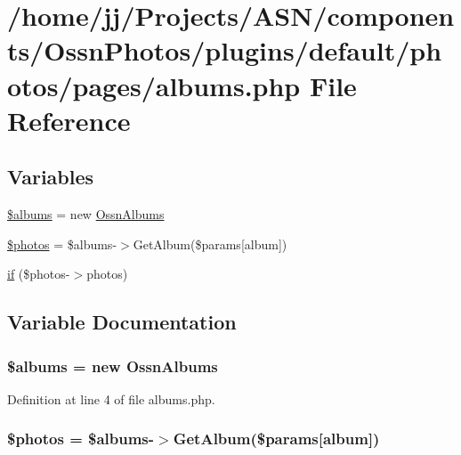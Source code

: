 \hypertarget{pages_2albums_8php}{}\section{/home/jj/\+Projects/\+A\+S\+N/components/\+Ossn\+Photos/plugins/default/photos/pages/albums.php File Reference}
\label{pages_2albums_8php}
\subsection*{Variables}
\begin{DoxyCompactItemize}
\item 
\hyperlink{pages_2albums_8php_a23e8244caaacd14d608137a383e8f0e7}{\$albums} = new \hyperlink{class_ossn_albums}{Ossn\+Albums}
\item 
\hyperlink{pages_2albums_8php_a7d16539c7a3688bee1d3184c81c47487}{\$photos} = \$albums-\/$>$Get\+Album(\$params\mbox{[}\textquotesingle{}album\textquotesingle{}\mbox{]})
\item 
\hyperlink{pages_2albums_8php_a5aed7d5753c8d4e84a25f746413591b9}{if} (\$photos-\/$>$photos)
\end{DoxyCompactItemize}


\subsection{Variable Documentation}
\subsubsection[{\texorpdfstring{\$albums}{$albums}}]{\setlength{\rightskip}{0pt plus 5cm}\$albums = new {\bf Ossn\+Albums}}\hypertarget{pages_2albums_8php_a23e8244caaacd14d608137a383e8f0e7}{}\label{pages_2albums_8php_a23e8244caaacd14d608137a383e8f0e7}


Definition at line 4 of file albums.\+php.

\subsubsection[{\texorpdfstring{\$photos}{$photos}}]{\setlength{\rightskip}{0pt plus 5cm}\$photos = \$albums-\/$>$Get\+Album(\$params\mbox{[}\textquotesingle{}album\textquotesingle{}\mbox{]})}\hypertarget{pages_2albums_8php_a7d16539c7a3688bee1d3184c81c47487}{}\label{pages_2albums_8php_a7d16539c7a3688bee1d3184c81c47487}


